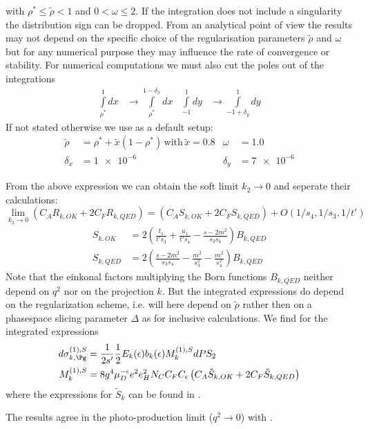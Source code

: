 with $\rho^*\leq\tilde\rho < 1$ and $0<\omega\leq 2$. If the integration does not include a singularity the distribution sign can be dropped. From an analytical point of view the results may not depend on the specific choice of the regularisation parameters $\tilde\rho$ and $\omega$ but for any numerical purpose they may influence the rate of convergence or stability. For numerical computations we must also cut the poles out of the integrations
\begin{align}
\int\limits_{\rho^*}^1\!dx &\rightarrow \int\limits_{\rho^*}^{1-\delta_x}\!\!\!dx &\int\limits_{-1}^1\!dy &\rightarrow \int\limits_{-1+\delta_y}^{1}\!\!dy
\end{align}
If not stated otherwise we use as a default setup:
\begin{align}
\tilde\rho &= \rho^* + \tilde x(1-\rho^*)\,\text{with}\, \tilde x=0.8 &\omega &= 1.0\\
\delta_x &= \num{1e-6} &\delta_y &=\num{7e-6}
\end{align}

From the above expression we can obtain the soft limit $k_2\rightarrow 0$ and seperate their calculations:
\begin{equation}
\lim_{k_2\rightarrow 0}\left(C_A R_{k,OK} + 2C_F R_{k,QED}\right) = \left(C_A S_{k,OK} + 2C_F S_{k,QED}\right) + O(1/s_4,1/s_3,1/t')
\end{equation}
\begin{align}
S_{k,OK}  &= 2\left(\frac{t_1}{t's_3} + \frac{u_1}{t's_4}-\frac{s-2m^2}{s_3s_4}\right)B_{k,QED}\\
S_{k,QED} &= 2\left(\frac{s-2m^2}{s_3s_4} - \frac{m^2}{s_3^2} - \frac{m^2}{s_4^2}\right)B_{k,QED}
\end{align}
Note that the einkonal factors multiplying the Born functions $B_{k,QED}$ neither depend on $q^2$ nor on the projection $k$. But the integrated expressions do depend on the regularization scheme, i.e. will here depend on $\tilde\rho$ rather then on a phasespace slicing parameter $\Delta$ as for inclusive calculations\cite{Laenen1993162}. We find for the integrated expressions
\begin{align}
d\sigma_{k,\Pg}^{(1),S} &= \frac 1 {2s'}\frac 1 2 E_k(\epsilon) b_k(\epsilon) M_k^{(1),S} dPS_2\\
M_k^{(1),S} &= 8g^4\mu_D^{-\epsilon}e^2e_H^2 N_C C_F C_\epsilon\left( C_A \tilde S_{k,OK} + 2C_F \tilde S_{k,QED}\right)
\end{align}
where the expressions for $\tilde S_k$ can be found in \cite{Harris:1995tu}.

The results agree in the photo-production limit ($q^2\rightarrow 0$) with \cite{Bojak:1998zm}.
